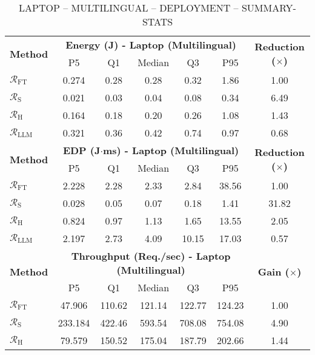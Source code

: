 \begin{table}[t]
\centering
\scriptsize
\caption{LAPTOP -- MULTILINGUAL -- DEPLOYMENT -- SUMMARY-STATS}
\label{tab:laptop_rq3}
\begin{tabular}{lcccccc}
\toprule
\multirow{2}{*}{\textbf{Method}} 
& \multicolumn{5}{c}{\textbf{Energy (J) - Laptop (Multilingual)}} & \multirow{2}{*}{\textbf{Reduction ($\times$)}} \\
\cmidrule(lr){2-6}
 & P5 & Q1 & Median & Q3 & P95 &  \\
\midrule
$\mathcal{R}_\text{FT}$ & 0.274 & 0.28 & 0.28 & 0.32 & 1.86 & 1.00 \\ %
$\mathcal{R}_\text{S}$ & 0.021 & 0.03 & 0.04 & 0.08 & 0.34 & 6.49 \\ %
$\mathcal{R}_\text{H}$ & 0.164 & 0.18 & 0.20 & 0.26 & 1.08 & 1.43 \\ %
$\mathcal{R}_\text{LLM}$ & 0.321 & 0.36 & 0.42 & 0.74 & 0.97 & 0.68 \\ %
\midrule
\multirow{2}{*}{\textbf{Method}} 
& \multicolumn{5}{c}{\textbf{EDP (J$\cdot$ms) - Laptop (Multilingual)}} & \multirow{2}{*}{\textbf{Reduction ($\times$)}} \\
\cmidrule(lr){2-6}
 & P5 & Q1 & Median & Q3 & P95 & \\
\midrule
$\mathcal{R}_\text{FT}$ & 2.228 & 2.28 & 2.33 & 2.84 & 38.56 & 1.00 \\ %
$\mathcal{R}_\text{S}$ & 0.028 & 0.05 & 0.07 & 0.18 & 1.41 & 31.82 \\ %
$\mathcal{R}_\text{H}$ & 0.824 & 0.97 & 1.13 & 1.65 & 13.55 & 2.05 \\ %
$\mathcal{R}_\text{LLM}$ & 2.197 & 2.73 & 4.09 & 10.15 & 17.03 & 0.57 \\ %
\midrule
\multirow{2}{*}{\textbf{Method}} 
& \multicolumn{5}{c}{\textbf{Throughput (Req./sec) - Laptop (Multilingual)}} & \multirow{2}{*}{\textbf{Gain ($\times$)}} \\
\cmidrule(lr){2-6}
 & P5 & Q1 & Median & Q3 & P95 & \\
\midrule
$\mathcal{R}_\text{FT}$ & 47.906 & 110.62 & 121.14 & 122.77 & 124.23 & 1.00 \\ %
$\mathcal{R}_\text{S}$ & 233.184 & 422.46 & 593.54 & 708.08 & 754.08 & 4.90 \\ %
$\mathcal{R}_\text{H}$ & 79.579 & 150.52 & 175.04 & 187.79 & 202.66 & 1.44 \\ %

\end{tabular}
\end{table}
